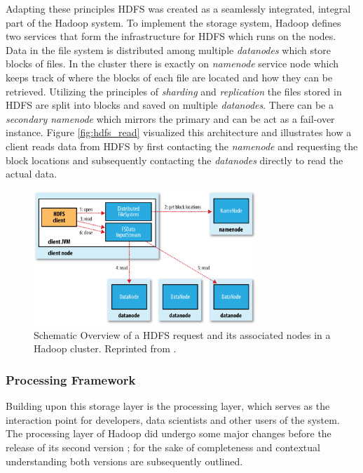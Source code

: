 Adapting these principles \ac{HDFS} was created as a seamlessly integrated, integral part of the Hadoop system. To implement the storage system, 
Hadoop defines two services that form the infrastructure for \ac{HDFS} which runs on the nodes. Data in the file system is distributed among multiple \emph{datanodes} which store blocks of files. In the cluster there is exactly on \emph{namenode} service node which keeps track of where the blocks of each file are located and how they can be retrieved. Utilizing the principles of \emph{sharding} and \emph{replication} the files stored in \ac{HDFS} are split into blocks and saved on multiple \emph{datanodes}. There can be a \emph{secondary namenode} which  mirrors the primary and can be act as a fail-over instance. Figure \autoref{fig:hdfs_read} visualized this architecture and illustrates how a client reads data from \ac{HDFS} by first contacting the \emph{namenode} and requesting the block locations and subsequently contacting the \emph{datanodes} directly to read the actual data.

\begin{figure}[htb]
     {\centering\includegraphics[width=0.75\textwidth]{img/hddg_0302.png}\par}
	\caption{Schematic Overview of a \ac{HDFS} request and its associated nodes in a Hadoop cluster. Reprinted from \textcite[][Chap.~3]{white2015hadoop}.}
	\label{fig:hdfs_read}
\end{figure}

\subsubsection{Processing Framework}

Building upon this storage layer is the processing layer, which serves as the interaction point for developers, data scientists and other users of the system. The processing layer of Hadoop did undergo some major changes before the release of its second version \autocite[p.~5]{vavilapalli2013apache}; for the sake of completeness and contextual understanding both versions are subsequently outlined.

